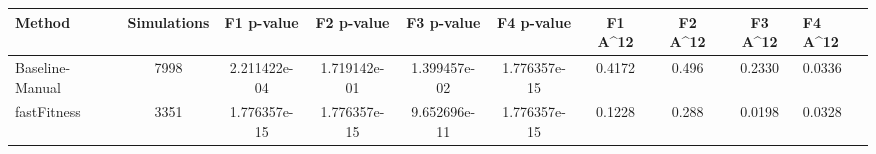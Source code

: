 \begin{tabular}{lcccccccc}
\toprule
         Method &  Simulations &   F1 p-value &   F2 p-value &   F3 p-value &   F4 p-value &  F1 A^12 &  F2 A^12 &  F3 A^12 &  F4 A^12 \\
\midrule
Baseline-Manual &         7998 & 2.211422e-04 & 1.719142e-01 & 1.399457e-02 & 1.776357e-15 &   0.4172 &    0.496 &   0.2330 &   0.0336 \\
    fastFitness &         3351 & 1.776357e-15 & 1.776357e-15 & 9.652696e-11 & 1.776357e-15 &   0.1228 &    0.288 &   0.0198 &   0.0328 \\
\bottomrule
\end{tabular}
